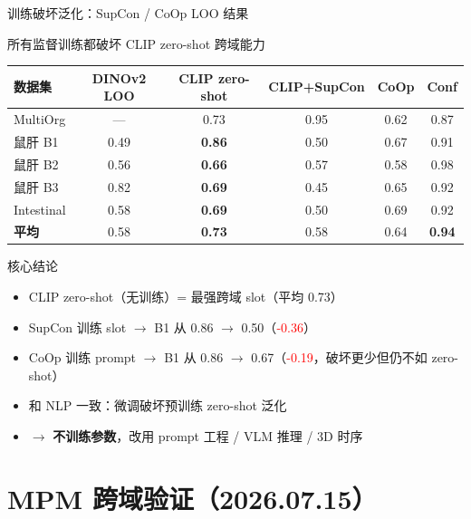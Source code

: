 \documentclass[aspectratio=169, 10pt]{beamer}
\begin{document}
\begin{frame}{训练破坏泛化：SupCon / CoOp LOO 结果}
  \begin{alertblock}{所有监督训练都破坏 CLIP zero-shot 跨域能力}
    \scriptsize
    \begin{tabular}{lccccc}
      \toprule
      \textbf{数据集} & \textbf{DINOv2 LOO} & \textbf{CLIP zero-shot} & \textbf{CLIP+SupCon} & \textbf{CoOp} & \textbf{Conf} \\
      \midrule
      MultiOrg & — & 0.73 & 0.95 & 0.62 & 0.87 \\
      鼠肝 B1 & 0.49 & \textbf{0.86} & 0.50 & 0.67 & 0.91 \\
      鼠肝 B2 & 0.56 & \textbf{0.66} & 0.57 & 0.58 & 0.98 \\
      鼠肝 B3 & 0.82 & \textbf{0.69} & 0.45 & 0.65 & 0.92 \\
      Intestinal & 0.58 & \textbf{0.69} & 0.50 & 0.69 & 0.92 \\
      \midrule
      \textbf{平均} & 0.58 & \textbf{0.73} & 0.58 & 0.64 & \textbf{0.94} \\
      \bottomrule
    \end{tabular}
  \end{alertblock}
  \vspace{0em}
  \begin{block}{核心结论}
    \begin{itemize}
      \item CLIP zero-shot（无训练）= 最强跨域 slot（平均 0.73）
      \item SupCon 训练 slot $\to$ B1 从 0.86 $\to$ 0.50（\textcolor{red}{-0.36}）
      \item CoOp 训练 prompt $\to$ B1 从 0.86 $\to$ 0.67（\textcolor{red}{-0.19}，破坏更少但仍不如 zero-shot）
      \item 和 NLP 一致：微调破坏预训练 zero-shot 泛化
      \item $\to$ \textbf{不训练参数}，改用 prompt 工程 / VLM 推理 / 3D 时序
    \end{itemize}
  \end{block}
\end{frame}


\section{MPM 跨域验证（2026.07.15）}
\end{document}
